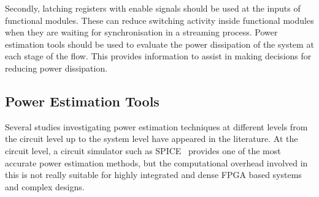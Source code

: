 Secondly, latching registers with enable signals should be used at the inputs of functional modules.
These can reduce switching activity inside functional modules when they are waiting for synchronisation in a streaming process.
Power estimation tools should be used to evaluate the power dissipation of the system at each stage of the flow.
This provides information to assist in making decisions for reducing power dissipation.

\subsection{Power Estimation Tools}

Several studies investigating power estimation techniques at different levels from the circuit level up to the system level have appeared in the literature.
At the circuit level, a circuit simulator such as SPICE~\cite{Deng1994} provides one of the most accurate power estimation methods, but the computational overhead involved in this is not really suitable for highly integrated and dense FPGA based systems and complex designs.

%

